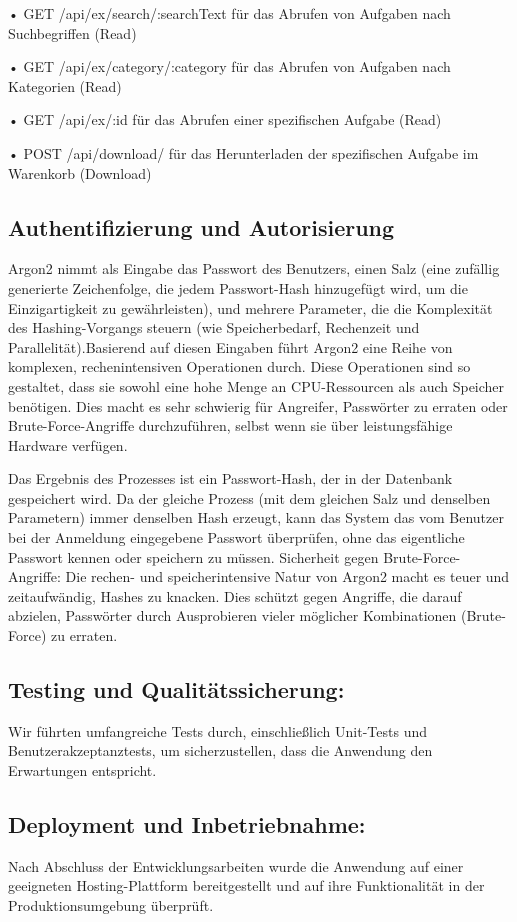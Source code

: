 •	GET /api/ex/search/:searchText	für das Abrufen von Aufgaben nach Suchbegriffen (Read)

•	GET /api/ex/category/:category	für das Abrufen von Aufgaben nach Kategorien (Read)

•	GET /api/ex/:id	für das Abrufen einer spezifischen Aufgabe (Read)

•	POST /api/download/ 	für das Herunterladen der spezifischen Aufgabe im Warenkorb (Download)



\subsection{Authentifizierung und Autorisierung}
Argon2 nimmt als Eingabe das Passwort des Benutzers, einen Salz (eine zufällig generierte Zeichenfolge, die jedem Passwort-Hash hinzugefügt wird, um die Einzigartigkeit zu gewährleisten), und mehrere Parameter, die die Komplexität des Hashing-Vorgangs steuern (wie Speicherbedarf, Rechenzeit und Parallelität).Basierend auf diesen Eingaben führt Argon2 eine Reihe von komplexen, rechenintensiven Operationen durch. Diese Operationen sind so gestaltet, dass sie sowohl eine hohe Menge an CPU-Ressourcen als auch Speicher benötigen. Dies macht es sehr schwierig für Angreifer, Passwörter zu erraten oder Brute-Force-Angriffe durchzuführen, selbst wenn sie über leistungsfähige Hardware verfügen.

Das Ergebnis des Prozesses ist ein Passwort-Hash, der in der Datenbank gespeichert wird. Da der gleiche Prozess (mit dem gleichen Salz und denselben Parametern) immer denselben Hash erzeugt, kann das System das vom Benutzer bei der Anmeldung eingegebene Passwort überprüfen, ohne das eigentliche Passwort kennen oder speichern zu müssen. Sicherheit gegen Brute-Force-Angriffe: Die rechen- und speicherintensive Natur von Argon2 macht es teuer und zeitaufwändig, Hashes zu knacken. Dies schützt gegen Angriffe, die darauf abzielen, Passwörter durch Ausprobieren vieler möglicher Kombinationen (Brute-Force) zu erraten.

\subsection{Testing und Qualitätssicherung: }
Wir führten umfangreiche Tests durch, einschließlich Unit-Tests und Benutzerakzeptanztests, um sicherzustellen, dass die Anwendung den Erwartungen entspricht.


\subsection{Deployment und Inbetriebnahme: }
Nach Abschluss der Entwicklungsarbeiten wurde die Anwendung auf einer geeigneten Hosting-Plattform bereitgestellt und auf ihre Funktionalität in der Produktionsumgebung überprüft.


